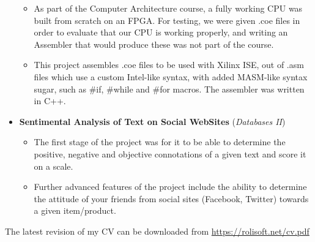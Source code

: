 \documentclass[11pt,a4paper]{article}
\begin{document}
\begin{itemize}
		\begin{itemize}
		\item	As part of the Computer Architecture course, a fully working CPU was built from scratch on an FPGA. For testing, we were given .coe files in order to evaluate that our CPU is working properly, and writing an Assembler that would produce these was not part of the course.
		\item	This project assembles .coe files to be used with Xilinx ISE, out of .asm files which use a custom Intel-like syntax, with added MASM-like syntax sugar, such as \#if, \#while and \#for macros. The assembler was written in C++.
		\end{itemize}
	\item	\textbf{Sentimental Analysis of Text on Social WebSites} (\textit{Databases II})
		\begin{itemize}
		\item	The first stage of the project was for it to be able to determine the positive, negative and objective connotations of a given text and score it on a scale.
		\item	Further advanced features of the project include the ability to determine the attitude of your friends from social sites (Facebook, Twitter) towards a given item/product.
		\end{itemize}
	\end{itemize}
	

	{\color{DarkGray} The latest revision of my CV can be downloaded from}
	\url{https://rolisoft.net/cv.pdf}
\end{document}
